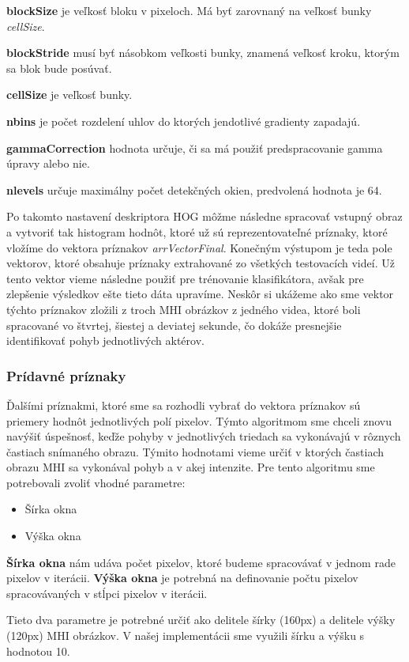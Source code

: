 \textbf{blockSize} je veľkosť bloku v pixeloch. Má byť zarovnaný na veľkosť bunky \textit{cellSize}.

\textbf{blockStride} musí byť násobkom veľkosti bunky, znamená veľkosť kroku, ktorým sa blok bude posúvať.

\textbf{cellSize} je veľkosť bunky.

\textbf{nbins} je počet rozdelení uhlov do ktorých jendotlivé gradienty zapadajú.

\textbf{gammaCorrection} hodnota určuje, či sa má použiť predspracovanie gamma úpravy alebo nie.

\textbf{nlevels} určuje maximálny počet detekčných okien, predvolená hodnota je 64.

Po takomto nastavení deskriptora HOG môžme následne spracovať vstupný obraz a vytvoriť tak histogram hodnôt, ktoré už sú reprezentovateľné príznaky, ktoré vložíme do vektora príznakov \textit{arrVectorFinal}. Konečným výstupom je teda pole vektorov, ktoré obsahuje príznaky extrahované zo všetkých testovacích videí. Už tento vektor vieme následne použiť pre trénovanie klasifikátora, avšak pre zlepšenie výsledkov ešte tieto dáta upravíme. Neskôr si ukážeme ako sme vektor týchto príznakov zložili z troch MHI obrázkov z jedného videa, ktoré boli spracované vo štvrtej, šiestej a deviatej sekunde, čo dokáže presnejšie identifikovať pohyb jednotlivých aktérov.


\subsubsection{Prídavné príznaky} \label{pridavny}
Ďalšími príznakmi, ktoré sme sa rozhodli vybrať do vektora príznakov sú priemery hodnôt jednotlivých polí pixelov. Týmto algoritmom sme chceli znovu navýšiť úspešnosť, keďže pohyby v jednotlivých triedach sa vykonávajú v rôznych častiach snímaného obrazu. Týmito hodnotami vieme určiť v ktorých častiach obrazu MHI sa vykonával pohyb a v akej intenzite. Pre tento algoritmu sme potrebovali zvoliť vhodné parametre: 
\begin{itemize}
\item Šírka okna
\item Výška okna
\end{itemize}

\textbf{Šírka okna} nám udáva počet pixelov, ktoré budeme spracovávať v jednom rade pixelov v iterácii.
\textbf{Výška okna} je potrebná na definovanie počtu pixelov spracovávaných v stĺpci pixelov v iterácii.

Tieto dva parametre je potrebné určiť ako delitele šírky (160px) a delitele výšky (120px) MHI obrázkov. V našej implementácii sme využili šírku a výšku s hodnotou 10.

